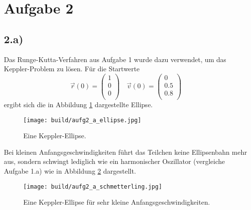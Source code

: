 \section*{Aufgabe 2}

\subsection*{2.a)}
Das Runge-Kutta-Verfahren aus Aufgabe 1 wurde dazu verwendet, um das Keppler-Problem
zu lösen.
Für die Startwerte
\begin{equation*}
    \vec{r}\!\left(0\right) =
    \begin{pmatrix}
        1 \\
        0 \\
        0 \\
    \end{pmatrix}
    \quad
    \vec{v}\!\left(0\right) =
    \begin{pmatrix}
        0 \\
        0.5 \\
        0.8 \\
    \end{pmatrix}
\end{equation*}
ergibt sich die in Abbildung \ref{fig:2_ellipse} dargestellte Ellipse.
\begin{figure}
  \centering
  \texttt{[image: build/aufg2\_a\_ellipse.jpg]}
  \caption{Eine Keppler-Ellipse.}
  \label{fig:2_ellipse}
\end{figure}

Bei kleinen Anfangsgeschwindigkeiten führt das Teilchen keine Ellipsenbahn mehr aus,
sondern schwingt lediglich wie ein harmonischer Oszillator (vergleiche Aufgabe 1.a)
wie in Abbildung \ref{fig:2_schmetterling} dargestellt.
\begin{figure}
  \centering
  \texttt{[image: build/aufg2\_a\_schmetterling.jpg]}
  \caption{Eine Keppler-Ellipse für sehr kleine Anfangsgeschwindigkeiten.}
  \label{fig:2_schmetterling}
\end{figure}

